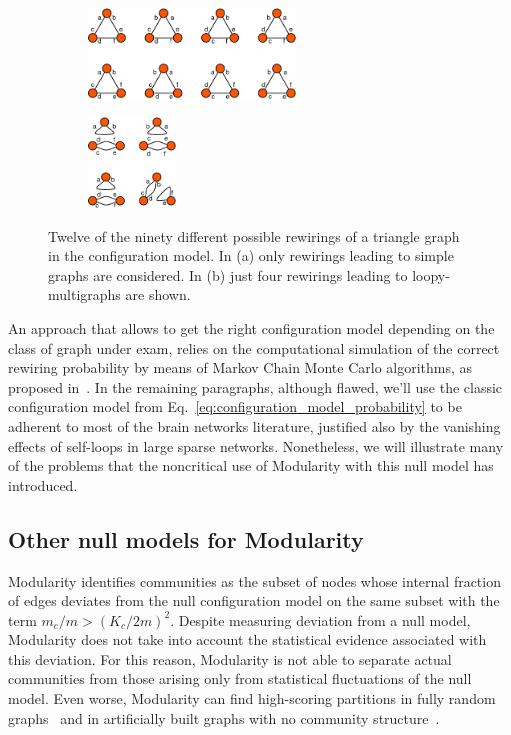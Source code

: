 \begin{figure}[htb]\centering
\begin{subfigure}[t]{0.45\textwidth}\centering
\includegraphics[height=2.4cm]{images/configuration_model_six_stubs.pdf}
\caption{}
\label{fig:reshuffle_simple_graphs}
\end{subfigure}
\begin{subfigure}[t]{0.45\textwidth}\centering
\includegraphics[height=2.4cm]{images/configuration_model_three_stubs.pdf}
\caption{}
\label{fig:reshuffle_loopy_multigraphs}
\end{subfigure}
\caption{Twelve of the ninety different possible rewirings of a triangle graph in the configuration model. In (a) only rewirings leading to simple graphs are considered. In (b) just four rewirings leading to loopy-multigraphs are shown.}
\label{fig:configuration_model_stubs}
\end{figure}
An approach that allows to get the right configuration model depending on the class of graph under exam, relies on the computational simulation of the correct rewiring probability by means of Markov Chain Monte Carlo algorithms, as proposed in~\cite{fosdick2016}.
In the remaining paragraphs, although flawed, we'll use the classic configuration model from Eq.~\ref{eq:configuration_model_probability} to be adherent to most of the brain networks literature, justified also by the vanishing effects of self-loops in large sparse networks. Nonetheless, we will illustrate many of the problems that the noncritical use of Modularity with this null model has introduced.

\subsection{Other null models for Modularity}
Modularity identifies communities as the subset of nodes whose internal fraction of edges deviates from the null configuration model on the same subset with the term $m_c/m > (K_c/2m)^2$.
Despite measuring deviation from a null model, Modularity does not take into account the statistical evidence associated with this deviation. For this reason, Modularity is not able to separate actual communities from those arising only from statistical fluctuations of the null model. Even worse, Modularity can find high-scoring partitions in fully random graphs~\cite{guimera2004} and in artificially built graphs with no community structure~\cite{kehagias2013}.

